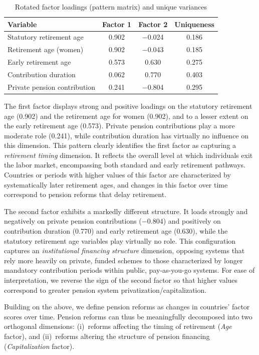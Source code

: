 \documentclass[11pt,english,a4paper, twoside, authoryear]{article}
\begin{document}
\begin{table}[h!]
\centering
\caption{Rotated factor loadings (pattern matrix) and unique variances}
\label{tab:pcfa_loadings}
\begin{tabular}{lccc}
\hline\hline
Variable & Factor 1 & Factor 2 & Uniqueness \\
\hline
Statutory retirement age      &  0.902 & $-$0.024 & 0.186 \\
Retirement age (women)        &  0.902 & $-$0.043 & 0.185 \\
Early retirement age          &  0.573 &   0.630  & 0.275 \\
Contribution duration         &  0.062 &   0.770  & 0.403 \\
Private pension contribution  &  0.241 & $-$0.804 & 0.295 \\
\hline\hline
\end{tabular}
\end{table}

The first factor displays strong and positive loadings on the statutory retirement age (0.902) and the retirement age for women (0.902), and to a lesser extent on the early retirement age (0.573). Private pension contributions play a more moderate role (0.241), while contribution duration has virtually no influence on this dimension. This pattern clearly identifies the first factor as capturing a \emph{retirement timing} dimension. It reflects the overall level at which individuals exit the labor market, encompassing both standard and early retirement pathways. Countries or periods with higher values of this factor are characterized by systematically later retirement ages, and changes in this factor over time correspond to pension reforms that delay retirement.

The second factor exhibits a markedly different structure. It loads strongly and negatively on private pension contributions ($-0.804$) and positively on contribution duration (0.770) and early retirement age (0.630), while the statutory retirement age variables play virtually no role. This configuration captures an \emph{institutional financing structure} dimension, opposing systems that rely more heavily on private, funded schemes to those characterized by longer mandatory contribution periods within public, pay-as-you-go systems. For ease of interpretation, we reverse the sign of the second factor so that higher values correspond to greater pension system privatization/capitalization.

Building on the above, we define pension reforms as changes in countries' factor scores over time. Pension reforms can thus be meaningfully decomposed into two orthogonal dimensions: (i)~reforms affecting the timing of retirement (\textit{Age} factor), and (ii)~reforms altering the structure of pension financing (\textit{Capitalization} factor).
\end{document}
